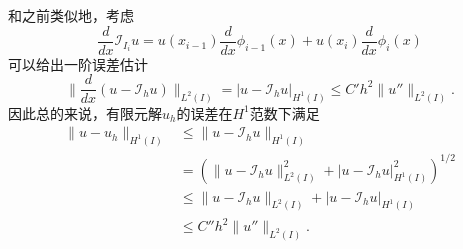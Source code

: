 \documentclass[a4paper,10pt]{ctexart}
\begin{document}
和之前类似地，考虑
\begin{equation}
    \frac{d}{dx}\mathcal{I}_{I_i}u = u(x_{i-1})\frac{d}{dx}\phi_{i-1}(x) + u(x_i)\frac{d}{dx}\phi_i(x)
\end{equation}
可以给出一阶误差估计
\begin{equation}
    \| \frac{d}{dx}(u-\mathcal{I}_h u) \|_{L^2(I)} = |u-\mathcal{I}_h u|_{H^1(I)} \leqslant C'h^2\| u'' \|_{L^2(I)}.
\end{equation}
因此总的来说，有限元解$ u_h $的误差在$ H^1 $范数下满足
\begin{equation}
    \begin{aligned}
        \| u-u_h \|_{H^1(I)} &\leqslant \| u-\mathcal{I}_h u \|_{H^1(I)}\\
        &= (\| u-\mathcal{I}_h u \|_{L^2(I)}^2 + | u-\mathcal{I}_h u |_{H^1(I)}^2)^{1 / 2} \\
        &\leqslant \| u-\mathcal{I}_h u \|_{L^2(I)} + | u-\mathcal{I}_h u |_{H^1(I)}\\
        &\leqslant C''h^2\| u'' \|_{L^2(I)}.
    \end{aligned}
\end{equation}
\end{document}
